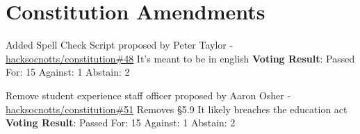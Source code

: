 \documentclass[11pt,hacksoc]{meetingmins}
\begin{document}
\section{Constitution Amendments}
	\begin{items}
	\item
	Added Spell Check Script proposed by Peter Taylor - \underline{\href{https://github.com/HackSocNotts/constitution/pull/48}{hacksocnotts/constitution\#48}}
		\subitem
		It's meant to be in english
		\subitem
		\textbf{Voting Result}: Passed
			\subsubitem
			For: 15
			\subsubitem
			Against: 1
			\subsubitem
			Abstain: 2
			
	\item
	Remove student experience staff officer proposed by Aaron Osher - \underline{\href{https://github.com/HackSocNotts/constitution/pull/51}{hacksocnotts/constitution\#51}}
		\subitem
		Removes \S 5.9
		\subitem
		It likely breaches the education act
		\subitem
		\textbf{Voting Result}: Passed
			\subsubitem
			For: 15
			\subsubitem
			Against: 1
			\subsubitem
			Abstain: 2
\end{items}
\end{document}
